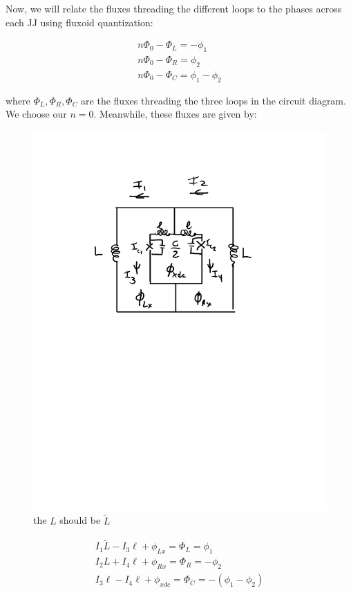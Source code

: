 \documentclass[paper=a4, twocolumn, fontsize=10pt]{article} %
\numberwithin{equation}{section} %
\numberwithin{figure}{section} %
\numberwithin{table}{section} %
\begin{document}
Now, we will relate the fluxes threading the different loops to the phases across each JJ using fluxoid quantization:

\begin{align}
     n\Phi_0 - \Phi_L = -\phi_1
    \\ 
    n \Phi_0 -  \Phi_R = \phi_2
    \\
    n \Phi_0 - \Phi_{C} = \phi_1  - \phi_2
\end{align}

where $\Phi_L, \Phi_R, \Phi_{C}$ are the fluxes threading the three loops in the circuit diagram. We choose our $n=0$. Meanwhile, these fluxes are given by:

\begin{figure}[H]
\centering
\includegraphics[scale=.5]{circuit_diagram.pdf}
\caption{the $L$ should be $\tilde{L}$}
\end{figure}

\begin{align}
    I_1 \tilde{L} - I_3 \ell + \phi_{Lx} = \Phi_{L} = \phi_1
    \\
    I_2 L + I_4 \ell + \phi_{Rx} = \Phi_{R} = -\phi_2
    \\
    I_3 \ell - I_4 \ell + \phi_{xdc} = \Phi_{C} = -(\phi_1 - \phi_2)
\end{align} 
\end{document}
